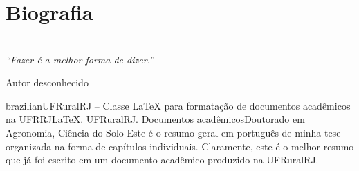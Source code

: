 \documentclass[tese, header, newmargins]{UFRuralRJ}
\begin{document}
\chapter*{Biografia}

\chapter*{}
\vfill
\begin{flushright}
  {\em
  ``Fazer é a melhor forma de dizer.''
  \par
  Autor desconhecido
  }
\end{flushright}

\def\tituloPT{UFRuralRJ -- Classe \LaTeX{} para formatação de documentos acadêmicos na UFRRJ}
\def\chavesPT{\LaTeX. UFRuralRJ. Documentos acadêmicos} %
\def\nivelPT{Doutorado em Agronomia, Ciência do Solo} %

\generalabstracttrue %
\begin{generalabstract}{brazilian}{\tituloPT}{\chavesPT}{\nivelPT} %
Este é o resumo geral em português de minha tese organizada na forma de capítulos individuais. Claramente, 
este é o melhor resumo que já foi escrito em um documento acadêmico produzido na UFRuralRJ.
\end{generalabstract}

\def\tituloEN{UFRuralRJ -- \LaTeX{} class for formatting academic documents at UFRRJ}
\def\chavesEN{\LaTeX. UFRuralRJ. Academical documents} %
\def\nivelEN{Doctor of Science in Agronomy, Soil Science} %
\end{document}
